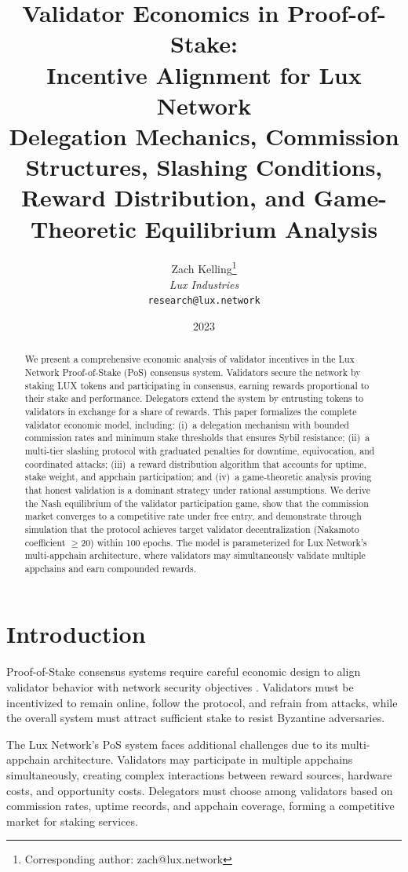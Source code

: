 \documentclass[11pt,a4paper]{article}
\title{\textbf{Validator Economics in Proof-of-Stake:\\Incentive Alignment for Lux Network}\\[6pt]
\large Delegation Mechanics, Commission Structures, Slashing Conditions,\\Reward Distribution, and Game-Theoretic Equilibrium Analysis}
\author{
Zach Kelling\thanks{Corresponding author: zach@lux.network}\\
\textit{Lux Industries}\\
\texttt{research@lux.network}
}
\date{2023}
\begin{document}
\luxcoverpage
\maketitle

\begin{abstract}
We present a comprehensive economic analysis of validator incentives in the Lux Network Proof-of-Stake (PoS) consensus system. Validators secure the network by staking LUX tokens and participating in consensus, earning rewards proportional to their stake and performance. Delegators extend the system by entrusting tokens to validators in exchange for a share of rewards. This paper formalizes the complete validator economic model, including: (i)~a delegation mechanism with bounded commission rates and minimum stake thresholds that ensures Sybil resistance; (ii)~a multi-tier slashing protocol with graduated penalties for downtime, equivocation, and coordinated attacks; (iii)~a reward distribution algorithm that accounts for uptime, stake weight, and appchain participation; and (iv)~a game-theoretic analysis proving that honest validation is a dominant strategy under rational assumptions. We derive the Nash equilibrium of the validator participation game, show that the commission market converges to a competitive rate under free entry, and demonstrate through simulation that the protocol achieves target validator decentralization (Nakamoto coefficient $\geq 20$) within 100 epochs. The model is parameterized for Lux Network's multi-appchain architecture, where validators may simultaneously validate multiple appchains and earn compounded rewards.
\end{abstract}

\section{Introduction}

Proof-of-Stake consensus systems require careful economic design to align validator behavior with network security objectives \cite{saleh2021blockchain, kiayias2017ouroboros}. Validators must be incentivized to remain online, follow the protocol, and refrain from attacks, while the overall system must attract sufficient stake to resist Byzantine adversaries.

The Lux Network's PoS system faces additional challenges due to its multi-appchain architecture. Validators may participate in multiple appchains simultaneously, creating complex interactions between reward sources, hardware costs, and opportunity costs. Delegators must choose among validators based on commission rates, uptime records, and appchain coverage, forming a competitive market for staking services.
\end{document}
